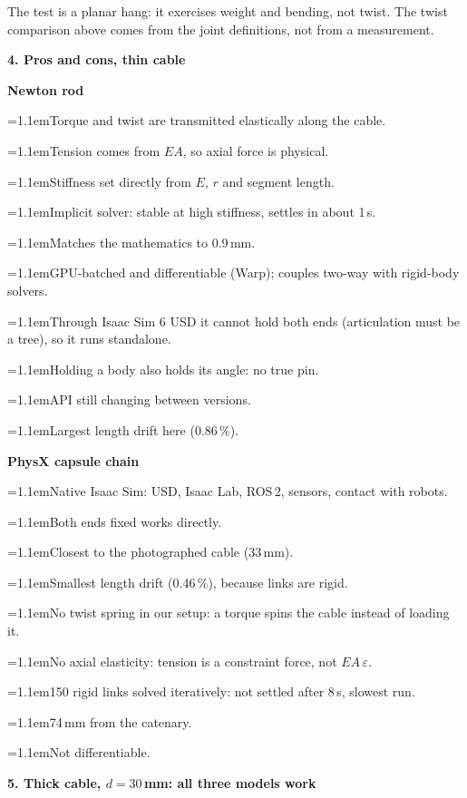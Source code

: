 \documentclass[10pt,a4paper]{article}
\newcommand{\panel}[1]{{\small\bfseries #1}}
\newcommand{\pro}{\par\hangindent=1.1em\hangafter=1\makebox[1.1em][l]{\textcolor{good}{\textbf{+}}}}
\newcommand{\con}{\par\hangindent=1.1em\hangafter=1\makebox[1.1em][l]{\textcolor{bad}{\textbf{--}}}}
\begin{document}
\vspace{-2pt}
{\small The test is a planar hang: it exercises weight and bending, not twist. The
twist comparison above comes from the joint definitions, not from a measurement.}

\vspace{6pt}
\panel{4. Pros and cons, thin cable}

\vspace{2pt}
{\small
\begin{minipage}[t]{0.49\linewidth}\setlength{\parskip}{1.5pt}
\textbf{Newton rod}
\pro Torque and twist are transmitted elastically along the cable.
\pro Tension comes from $EA$, so axial force is physical.
\pro Stiffness set directly from $E$, $r$ and segment length.
\pro Implicit solver: stable at high stiffness, settles in about 1\,s.
\pro Matches the mathematics to 0.9\,mm.
\pro GPU-batched and differentiable (Warp); couples two-way with rigid-body solvers.
\con Through Isaac Sim 6 USD it cannot hold both ends (articulation must be a tree), so it runs standalone.
\con Holding a body also holds its angle: no true pin.
\con API still changing between versions.
\con Largest length drift here (0.86\,\%).
\end{minipage}\hfill
\begin{minipage}[t]{0.48\linewidth}\setlength{\parskip}{1.5pt}
\textbf{PhysX capsule chain}
\pro Native Isaac Sim: USD, Isaac Lab, ROS\,2, sensors, contact with robots.
\pro Both ends fixed works directly.
\pro Closest to the photographed cable (33\,mm).
\pro Smallest length drift (0.46\,\%), because links are rigid.
\con No twist spring in our setup: a torque spins the cable instead of loading it.
\con No axial elasticity: tension is a constraint force, not $EA\,\varepsilon$.
\con 150 rigid links solved iteratively: not settled after 8\,s, slowest run.
\con 74\,mm from the catenary.
\con Not differentiable.
\end{minipage}}

\clearpage
\panel{5. Thick cable, $d=30$\,mm: all three models work}
\end{document}
